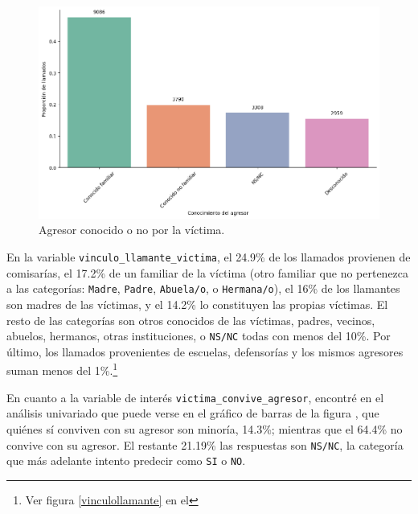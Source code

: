 \documentclass[10 pt]{article}
\begin{document}
    \begin{figure}[H]
        \begin{center}
        \includegraphics[scale=.4]{images/latex_agresor_conocido_no.png}
        \caption{Agresor conocido o no por la víctima.}
        \label{conocidodesconocido}
        \end{center}
        \end{figure}




 En la variable \texttt{vinculo\_llamante\_victima}, el 24.9\% de los llamados provienen de comisarías, el 17.2\% de un familiar de la víctima (otro familiar que no pertenezca a las categorías: \texttt{Madre}, \texttt{Padre}, \texttt{Abuela/o}, o \texttt{Hermana/o}), el 16\% de los llamantes son madres de las víctimas, y el 14.2\% lo constituyen las propias víctimas. El resto de las categorías son otros conocidos de las víctimas, padres, vecinos, abuelos, hermanos, otras instituciones, o \texttt{NS/NC} todas con menos del 10\%. Por último, los llamados provenientes de escuelas, defensorías y los mismos agresores suman menos del 1\%.\footnote{Ver figura \ref{vinculollamante} en el }



En cuanto a la variable de interés \texttt{victima\_convive\_agresor}, encontré en el análisis univariado que puede verse en el gráfico de barras de la figura , que quiénes sí conviven con su agresor son minoría, 14.3\%; mientras que el 64.4\% no convive con su agresor. El restante 21.19\% las respuestas son \texttt{NS/NC}, la categoría que más adelante intento predecir como \texttt{SI} o \texttt{NO}.  
\end{document}
